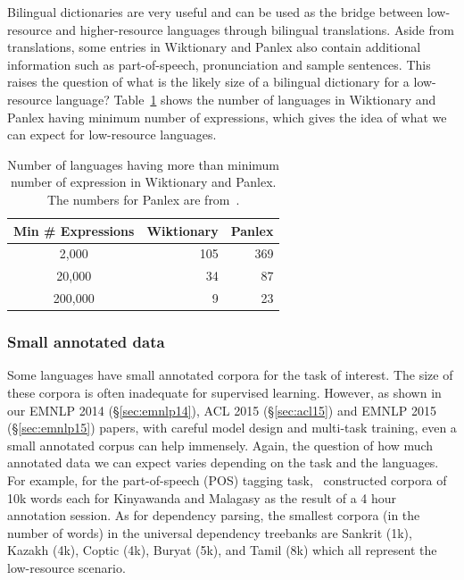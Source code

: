 \documentclass[12pt,twoside,final,hidelinks]{ltthesis}
\theoremstyle{definition}
\newcommand\emnlpiv{EMNLP 2014 (\S\ref{sec:emnlp14})}
\newcommand\aclv{ACL 2015 (\S\ref{sec:acl15})}
\newcommand\emnlpv{EMNLP 2015 (\S\ref{sec:emnlp15})}
\begin{document}
Bilingual dictionaries are very useful and can be used as the bridge between low-resource and higher-resource languages through bilingual translations. Aside from translations, some entries in Wiktionary and Panlex also contain additional information such as part-of-speech, pronunciation and sample sentences. 
This raises the question of what is the likely size of a bilingual dictionary for a low-resource language? 
Table~\ref{tab:expression_wik_pan} shows the number of languages in Wiktionary and Panlex 
having minimum number of expressions, which gives the idea of what we can expect for low-resource languages. 
\begin{table}
\centering
\begin{tabular}{crr}
\toprule
Min \# Expressions & Wiktionary & Panlex \\
\midrule
2,000          & 105        & 369    \\
20,000         & 34         & 87     \\
200,000        & 9          & 23    \\
\bottomrule
\end{tabular}
\caption[Number of languages having more than minimum number of expression in Wiktionary and Panlex]{Number of languages having more than minimum number of expression in Wiktionary and Panlex. The numbers for Panlex are from~\protect{}.}
\label{tab:expression_wik_pan}
\end{table}

\subsubsection{Small annotated data}
Some languages have small annotated corpora for the task of interest. The size of these corpora is often inadequate for supervised learning. However, as shown in our \emnlpiv{}, \aclv{} and 
\emnlpv{} papers, with careful model design and multi-task training, even a small annotated corpus can help immensely. Again, the question of how much annotated data we can expect varies depending on the task and the languages. For example, for the part-of-speech (POS) tagging task,~ constructed corpora of 10k words each for Kinyawanda and Malagasy as the result of a 4 hour annotation session. As for dependency parsing, the smallest corpora (in the number of words) in the universal dependency treebanks are Sankrit (1k), Kazakh (4k), Coptic (4k), Buryat (5k), and Tamil (8k) which all represent the low-resource scenario. %
\end{document}
